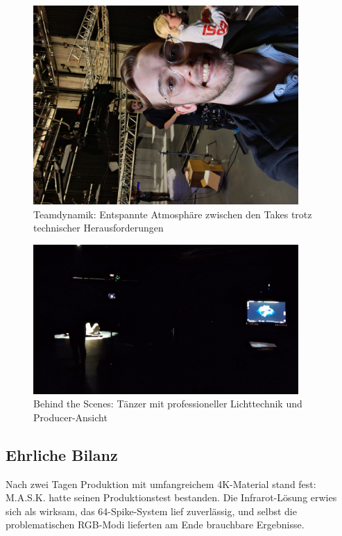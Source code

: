 \begin{figure}[h]
   \centering
   \includegraphics[width=0.9\textwidth]{images/onSetImages/MartySmileyIntoCameraOnSet.jpg}
   \caption{Teamdynamik: Entspannte Atmosphäre zwischen den Takes trotz technischer Herausforderungen}
   \label{fig:team_atmosphere}
\end{figure}

\begin{figure}[h]
   \centering
   \includegraphics[width=0.9\textwidth]{images/BTS_TopDown_DancerAndProducer.png}
   \caption{Behind the Scenes: Tänzer mit professioneller Lichttechnik und Producer-Ansicht}
   \label{fig:studio_wide}
\end{figure}

\newpage

\subsection{Ehrliche Bilanz}

Nach zwei Tagen Produktion mit umfangreichem 4K-Material stand fest: M.A.S.K. hatte seinen Produktionstest bestanden. Die Infrarot-Lösung erwies sich als wirksam, das 64-Spike-System lief zuverlässig, und selbst die problematischen RGB-Modi lieferten am Ende brauchbare Ergebnisse.

